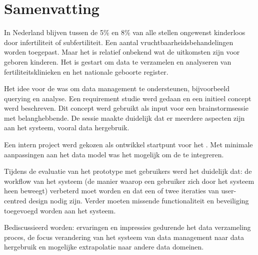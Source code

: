 {}

\section*{Samenvatting}

In Nederland blijven tussen de 5\% en 8\% van alle stellen ongewenst kinderloos door infertiliteit of subfertiliteit.
Een aantal vruchtbaarheidsbehandelingen worden toegepast.
Maar het is relatief onbekend wat de uitkomsten zijn voor geboren kinderen.
Het \project{} is gestart om data te verzamelen en analyseren van fertiliteitsklinieken en het nationale geboorte register.

Het idee voor de \ivfsystem{} was om data management te ondersteunen, bijvoorbeeld querying en analyse.
Een requirement studie werd gedaan en een initieel concept werd beschreven.
Dit concept werd gebruikt als input voor een brainstormsessie met belanghebbende.
De sessie maakte duidelijk dat er meerdere aspecten zijn aan het systeem, vooral data hergebruik.

Een intern project werd gekozen als ontwikkel startpunt voor het \ivfsystem{}.
Met minimale aanpassingen aan het data model was het mogelijk om de \projectdata{} te integreren.

Tijdens de evaluatie van het prototype met gebruikers werd het duidelijk dat: de workflow van het systeem (de manier waarop een gebruiker zich door het systeem heen beweegt) verbeterd moet worden en dat een of twee iteraties van user-centred design nodig zijn.
Verder moeten missende functionaliteit en beveiliging toegevoegd worden aan het systeem.

Bediscussieerd worden: ervaringen en impressies gedurende het data verzameling proces, de focus verandering van het systeem van data management naar data hergebruik en mogelijke extrapolatie naar andere data domeinen.